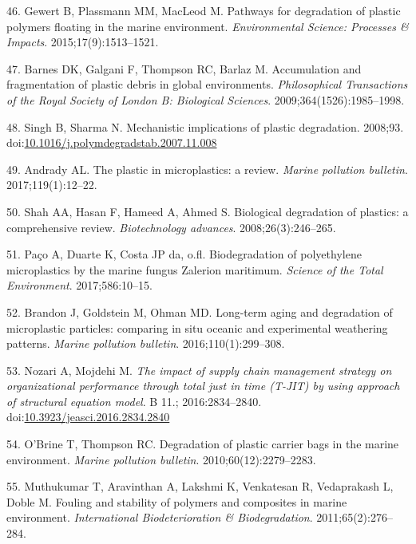 \documentclass[icelandic,]{book}
\begin{document}
\leavevmode\hypertarget{ref-gewert2015pathways}{}%
46. Gewert B, Plassmann MM, MacLeod M. Pathways for degradation of plastic polymers floating in the marine environment. \emph{Environmental Science: Processes \& Impacts}. 2015;17(9):1513--1521.

\leavevmode\hypertarget{ref-barnes2009accumulation}{}%
47. Barnes DK, Galgani F, Thompson RC, Barlaz M. Accumulation and fragmentation of plastic debris in global environments. \emph{Philosophical Transactions of the Royal Society of London B: Biological Sciences}. 2009;364(1526):1985--1998.

\leavevmode\hypertarget{ref-Singh2008}{}%
48. Singh B, Sharma N. Mechanistic implications of plastic degradation. 2008;93. doi:\href{https://doi.org/10.1016/j.polymdegradstab.2007.11.008}{10.1016/j.polymdegradstab.2007.11.008}

\leavevmode\hypertarget{ref-andrady2017plastic}{}%
49. Andrady AL. The plastic in microplastics: a review. \emph{Marine pollution bulletin}. 2017;119(1):12--22.

\leavevmode\hypertarget{ref-shah2008biological}{}%
50. Shah AA, Hasan F, Hameed A, Ahmed S. Biological degradation of plastics: a comprehensive review. \emph{Biotechnology advances}. 2008;26(3):246--265.

\leavevmode\hypertarget{ref-pacco2017biodegradation}{}%
51. Paço A, Duarte K, Costa JP da, o.fl. Biodegradation of polyethylene microplastics by the marine fungus Zalerion maritimum. \emph{Science of the Total Environment}. 2017;586:10--15.

\leavevmode\hypertarget{ref-brandon2016long}{}%
52. Brandon J, Goldstein M, Ohman MD. Long-term aging and degradation of microplastic particles: comparing in situ oceanic and experimental weathering patterns. \emph{Marine pollution bulletin}. 2016;110(1):299--308.

\leavevmode\hypertarget{ref-Nozari2016}{}%
53. Nozari A, Mojdehi M. \emph{The impact of supply chain management strategy on organizational performance through total just in time (T-JIT) by using approach of structural equation model}. B 11.; 2016:2834--2840. doi:\href{https://doi.org/10.3923/jeasci.2016.2834.2840}{10.3923/jeasci.2016.2834.2840}

\leavevmode\hypertarget{ref-o2010degradation}{}%
54. O'Brine T, Thompson RC. Degradation of plastic carrier bags in the marine environment. \emph{Marine pollution bulletin}. 2010;60(12):2279--2283.

\leavevmode\hypertarget{ref-muthukumar2011fouling}{}%
55. Muthukumar T, Aravinthan A, Lakshmi K, Venkatesan R, Vedaprakash L, Doble M. Fouling and stability of polymers and composites in marine environment. \emph{International Biodeterioration \& Biodegradation}. 2011;65(2):276--284.
\end{document}
